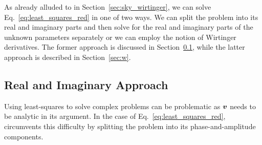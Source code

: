 \documentclass[useAMS,usenatbib]{mn2e}
\newcommand{\bv}{\bmath{v}}
\begin{document}

As already alluded to in Section~\ref{sec:sky_wirtinger}, we can solve Eq.~\eqref{eq:least_squares_red} in one of two ways. We can split the problem into its real and
imaginary parts and then solve for the real and imaginary parts of the unknown parameters separately or we can employ the notion of Wirtinger derivatives. The former 
approach is discussed in Section~\ref{sec:ri}, while the latter approach is described in Section~\ref{sec:w}. 

\subsection{Real and Imaginary Approach}
\label{sec:ri}
Using least-squares to solve complex problems can be problematic as $\bv$ needs to be analytic in its argument. In the case 
of Eq.~\eqref{eq:least_squares_red}, \citet{Liu2010} circumvents this difficulty by 
splitting the problem into its phase-and-amplitude components. 
\end{document}
